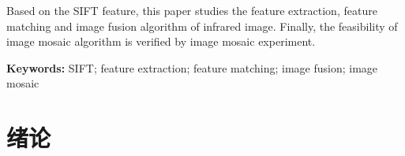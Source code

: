 \documentclass[10.5pt,a4paper]{article}
\numberwithin{equation}{section}
\numberwithin{figure}{section}
\numberwithin{table}{section}
\renewcommand{\headrulewidth}{0pt}
\begin{document}
\par
Based on the SIFT feature, this paper studies the feature extraction, feature matching and image fusion algorithm of infrared image. Finally, the feasibility of image mosaic algorithm is verified by image mosaic experiment.%
\par
\vspace{2em}
\par
\noindent \textbf{Keywords:} SIFT; feature extraction; feature matching; image fusion; image mosaic
\newpage
{}
{}
\tableofcontents
\newpage
{}
{}
\tableofengcontents
\newpage %
\pagestyle{fancy}
\fancyhf{}
\fancyhead[C]{\fontsize{10.5pt}{\baselineskip}\selectfont \leftmark}
\fancyfoot[C]{\fontsize{9pt}{\baselineskip}\selectfont\thepage}
\renewcommand{\headrulewidth}{0.5pt}
\setcounter{page}{1}
\fontsize{12pt}{16pt}\selectfont
\section{绪论\label{sectionXulun}}
\end{document}
